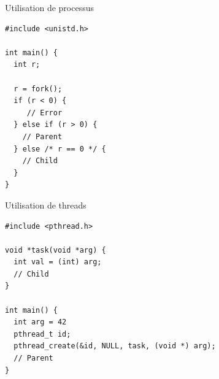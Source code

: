 \begin{frame}[fragile]{Utilisation de processus}
\begin{lstlisting}
#include <unistd.h>

int main() {
  int r;

  r = fork();
  if (r < 0) {
     // Error
  } else if (r > 0) {
    // Parent
  } else /* r == 0 */ {
    // Child
  }
}
\end{lstlisting}
\end{frame}

\begin{frame}[fragile]{Utilisation de threads}
\begin{lstlisting}
#include <pthread.h>

void *task(void *arg) {
  int val = (int) arg;
  // Child
}

int main() {
  int arg = 42
  pthread_t id;
  pthread_create(&id, NULL, task, (void *) arg);
  // Parent
}
\end{lstlisting}
\end{frame}


